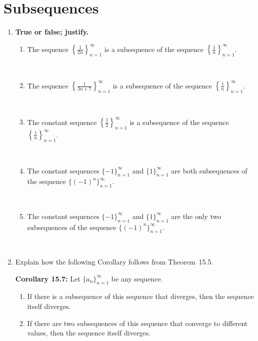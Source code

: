 \documentclass[12pt]{amsart}
\begin{document}
	
	\thispagestyle{empty}
	
	\section*{Subsequences}
	
\begin{enumerate} 

 \item \textbf{True or false; justify.}
\begin{enumerate} 
\item The sequence $\displaystyle \left\{ \frac{1}{2n} \right\}_{n=1}^\infty$ is a subsequence of the sequence $\displaystyle \left\{ \frac{1}{n} \right\}_{n=1}^\infty$.

\

\item The sequence $\displaystyle \left\{ \frac{1}{3n+7} \right\}_{n=1}^\infty$ is a subsequence of the sequence $\displaystyle \left\{ \frac{1}{n} \right\}_{n=1}^\infty$.

\

\item The constant sequence $\displaystyle \left\{ \frac{1}{2} \right\}_{n=1}^\infty$ is a subsequence of the sequence $\displaystyle \left\{ \frac{1}{n} \right\}_{n=1}^\infty$.

\

\item The constant sequences $\{ -1 \}_{n=1}^\infty$ and  $\{ 1 \}_{n=1}^\infty$ are both subsequences of the sequence $\{ (-1)^n \}_{n=1}^\infty$.

\

\item The constant sequences $\{ -1 \}_{n=1}^\infty$ and  $\{ 1 \}_{n=1}^\infty$ are the only two subsequences of the sequence $\{ (-1)^n \}_{n=1}^\infty$.

\end{enumerate}

\

\item Explain how the following Corollary follows from Theorem~15.5.
\begin{framed}
\noindent \textbf{Corollary 15.7:} Let $\{a_n\}_{n=1}^\infty$ be any sequence.
\begin{enumerate}
\item If there is a subsequence of this sequence that diverges, then the sequence itself diverges.
\item If there are two subsequences of this sequence that converge to different values, then the sequence itself diverges.
\end{enumerate}
\end{framed}



\end{enumerate}
\end{document}

